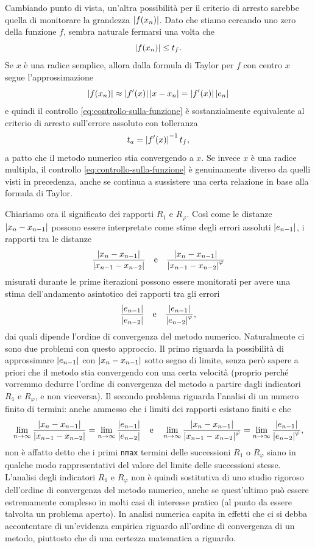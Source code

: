 Cambiando punto di vista, un'altra possibilità per il criterio di arresto
sarebbe quella di monitorare la grandezza $\left\lvert f(x_n)\right\rvert$.
Dato che stiamo cercando uno zero della funzione $f$, sembra naturale
fermarsi una volta che
\begin{equation} \label{eq:controllo-sulla-funzione}
\left\lvert f(x_n)\right\rvert \leq t_f.
\end{equation}
Se $x$ è una radice semplice, allora dalla formula di Taylor
per $f$ con centro $x$ segue l'approssimazione
\[
\left\lvert f(x_n)\right\rvert \approx \left\lvert f'(x)\right\rvert \left\lvert x-x_n\right\rvert = \left\lvert f'(x)\right\rvert \left\lvert e_n\right\rvert
\]
e quindi il controllo \eqref{eq:controllo-sulla-funzione} è sostanzialmente
equivalente al criterio di arresto sull'errore assoluto con tolleranza
\[
t_a = \left\lvert f'(x)\right\rvert^{-1} t_f,
\]
a patto che il metodo numerico stia convergendo a $x$.
Se invece $x$ è una radice multipla, il controllo \eqref{eq:controllo-sulla-funzione}
è genuinamente diverso da quelli visti in precedenza, anche se continua
a sussistere una certa relazione in base alla formula di Taylor.

Chiariamo ora il significato dei rapporti $R_1$ e $R_\varphi$.
Così come le distanze $\left\lvert x_n-x_{n-1}\right\rvert$ possono essere interpretate
come stime degli errori assoluti $\left\lvert e_{n-1}\right\rvert$, i rapporti tra le distanze
\[
\frac{\left\lvert x_n-x_{n-1}\right\rvert}{\left\lvert x_{n-1}-x_{n-2}\right\rvert}
\quad \text{e} \quad
\frac{\left\lvert x_n-x_{n-1}\right\rvert}{\left\lvert x_{n-1}-x_{n-2}\right\rvert^\varphi}
\]
misurati durante le prime  iterazioni possono essere monitorati per
avere una stima dell'andamento asintotico dei rapporti tra gli errori
\[
\frac{\left\lvert e_{n-1}\right\rvert}{\left\lvert e_{n-2}\right\rvert}
\quad \text{e} \quad
\frac{\left\lvert e_{n-1}\right\rvert}{\left\lvert e_{n-2}\right\rvert^\varphi},
\]
dai quali dipende l'ordine di convergenza del metodo numerico.
Naturalmente ci sono due problemi con questo approccio.
Il primo riguarda la possibilità di approssimare $\left\lvert e_{n-1}\right\rvert$
con $\left\lvert x_n-x_{n-1}\right\rvert$ sotto segno di limite, senza però sapere a priori
che il metodo stia convergendo con una certa velocità (proprio
perché vorremmo dedurre l'ordine di convergenza del metodo a partire
dagli indicatori $R_1$ e $R_\varphi$, e non viceversa).
Il secondo problema riguarda l'analisi di un numero finito di termini:
anche ammesso che i limiti dei rapporti esistano finiti e che
\[
\lim_{n \to \infty} \frac{\left\lvert x_n-x_{n-1}\right\rvert}{\left\lvert x_{n-1}-x_{n-2}\right\rvert}
= \lim_{n \to \infty} \frac{\left\lvert e_{n-1}\right\rvert}{\left\lvert e_{n-2}\right\rvert}
\quad \text{e} \quad
\lim_{n \to \infty} \frac{\left\lvert x_n-x_{n-1}\right\rvert}{\left\lvert x_{n-1}-x_{n-2}\right\rvert^\varphi}
= \lim_{n \to \infty} \frac{\left\lvert e_{n-1}\right\rvert}{\left\lvert e_{n-2}\right\rvert^\varphi},
\]
non è affatto detto che i primi \texttt{nmax} termini delle successioni
$R_1$ o $R_\varphi$ siano in qualche modo rappresentativi del
valore del limite delle successioni stesse.
L'analisi degli indicatori $R_1$ e $R_\varphi$ non è quindi sostitutiva di
uno studio rigoroso dell'ordine di convergenza del metodo numerico,
anche se quest'ultimo può essere estremamente complesso
in molti casi di interesse pratico (al punto da essere talvolta un problema aperto).
In analisi numerica capita in effetti che ci si debba
accontentare di un'evidenza empirica riguardo all'ordine di convergenza
di un metodo, piuttosto che di una certezza matematica a riguardo.

